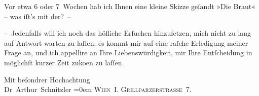 \pstart
           Vor etwa 6 oder 7 Wochen hab {\pb}ich Ihnen eine kleine Skizze
               geſandt »Die Braut« – was iſt’s mit der? –\pend
           
\pstart
           – Jedenfalls will ich noch das höfliche Erſuchen hinzuſetzen, mich nicht zu lang auf
               Antwort warten zu laſſen; es kommt mir auf eine raſche Erledigung meiner Frage an,
               und ich appellire an Ihre Liebenswürdigkeit, mir Ihre Entſcheidung in möglichſt
               kurzer Zeit zu{\pb}ko{\geminationm}en zu
               laſſen.\pend
           
\pstart
           Mit beſondrer Hochachtung{\\[\baselineskip]}\spacefill\mbox{Dr Arthur Schnitzler}\pend
           \leftskip=0em{}
\pstart
           \noindent{}\textsc{Wien I. Grillparzerstraße 7}.\pend
           \endnumbering{}  \newcommand{\dateiname}{L00215}\newcommand{\titel}{Arthur Schnitzler an Wilhelm Bölsche, 1. 6. 1893}\newcommand{\editorInnen}{Martin Anton Müller und Gerd-Hermann Susen}
